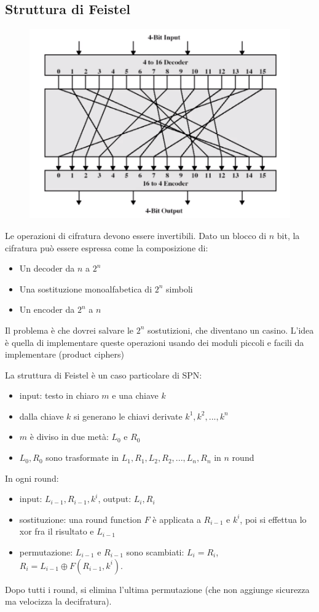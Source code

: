 \subsection*{Struttura di Feistel}

\begin{figure}[h]
	\centering
	\includegraphics[width=0.85\linewidth]{immagini/img44}
\end{figure}
Le operazioni di cifratura devono essere invertibili. Dato un blocco di $n$ bit, la cifratura può essere espressa come la composizione di:
\begin{itemize}
	\item Un decoder da $n$ a $2^n$
	\item Una sostituzione monoalfabetica di $2^n$ simboli
	\item Un encoder da $2^n$ a $n$
\end{itemize}
Il problema è che dovrei salvare le $2^n$ sostutizioni, che diventano un casino.
L'idea è quella di implementare queste operazioni usando dei moduli piccoli e facili da implementare (product ciphers)

La struttura di Feistel è un caso particolare di SPN:
\begin{itemize}
	\item input: testo in chiaro $m$ e una chiave $k$
	\item dalla chiave $k$ si generano le chiavi derivate $k^1, k^2, ..., k^n$
	\item $m$ è diviso in due metà: $L_0$ e $R_0$
	\item $L_0,R_0$ sono trasformate in $L_1,R_1, L_2,R_2, ..., L_n,R_n$ in $n$ round
\end{itemize}
In ogni round:
\begin{itemize}
	\item input: $L_{i-1}, R_{i-1}, k^i$, output: $L_i,R_i$
	\item sostituzione: una round function $F$ è applicata a $R_{i-1}$ e $k^i$, poi si effettua lo xor fra il risultato e $L_{i-1}$
	\item permutazione: $L_{i-1}$ e $R_{i-1}$ sono scambiati: $L_i=R_i$, $R_i=L_{i-1} \oplus F(R_{i-1}, k^i)$.
\end{itemize}
Dopo tutti i round, si elimina l'ultima permutazione (che non aggiunge sicurezza ma velocizza la decifratura).

